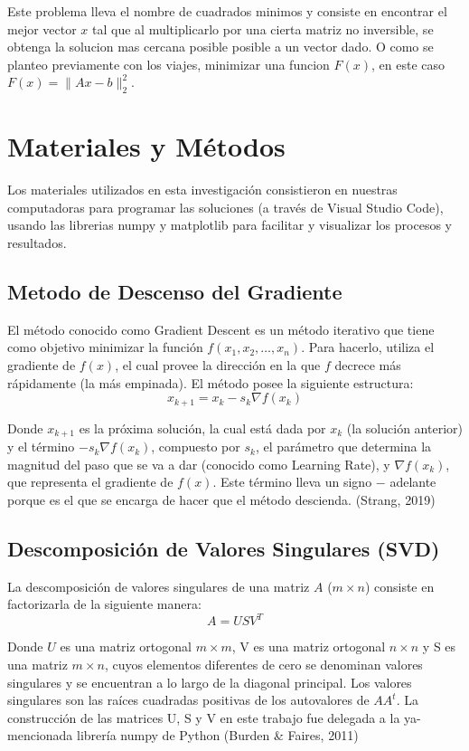 \documentclass{article}
\begin{document}
\noindent Este problema lleva el nombre de cuadrados minimos y consiste en encontrar el mejor vector $x$ tal que al multiplicarlo por una cierta matriz no inversible, se obtenga la solucion mas cercana posible posible a un vector dado. O como se planteo previamente con los viajes, minimizar una funcion $F(x)$, en este caso $F(x) = \|Ax - b\|^2_2$.


\section*{Materiales y Métodos}

\noindent Los materiales utilizados en esta investigación consistieron en nuestras computadoras para programar las soluciones (a través de Visual Studio Code), usando las librerias numpy y matplotlib para facilitar y visualizar los procesos y resultados. 

\subsection*{Metodo de Descenso del Gradiente}
\noindent El método conocido como Gradient Descent es un método iterativo que tiene como objetivo minimizar la función \( f(x_1, x_2, \ldots, x_n) \). Para hacerlo, utiliza el gradiente de \( f(x) \), el cual provee la dirección en la que \( f \) decrece más rápidamente (la más empinada). El método posee la siguiente estructura: \[ x_{k+1} = x_k - s_k \nabla f(x_k) \]

\noindent Donde \( x_{k+1} \) es la próxima solución, la cual está dada por \( x_k \) (la solución anterior) y el término \( - s_k \nabla f(x_k) \), compuesto por \( s_k \), el parámetro que determina la magnitud del paso que se va a dar (conocido como Learning Rate), y \( \nabla f(x_k) \), que representa el gradiente de \( f(x) \). Este término lleva un signo \( - \) adelante porque es el que se encarga de hacer que el método descienda. (Strang, 2019)


\subsection*{Descomposición de Valores Singulares (SVD)}
La descomposición de valores singulares de una matriz \(A\) ($m \times n$) consiste en factorizarla de la siguiente manera: \[A = USV^T
\] 

\noindent Donde $U$ es una matriz ortogonal $m \times m$, V es una matriz ortogonal $n \times n$ y S es una matriz $m \times n$, cuyos elementos diferentes de cero se denominan valores singulares y se encuentran a lo largo de la diagonal principal. Los valores singulares son las raíces cuadradas positivas de los autovalores de \(AA^t\). La construcción de las matrices U, S y V en este trabajo fue delegada a la ya-mencionada librería numpy de Python (Burden \& Faires, 2011) \vspace{\baselineskip}
\end{document}
